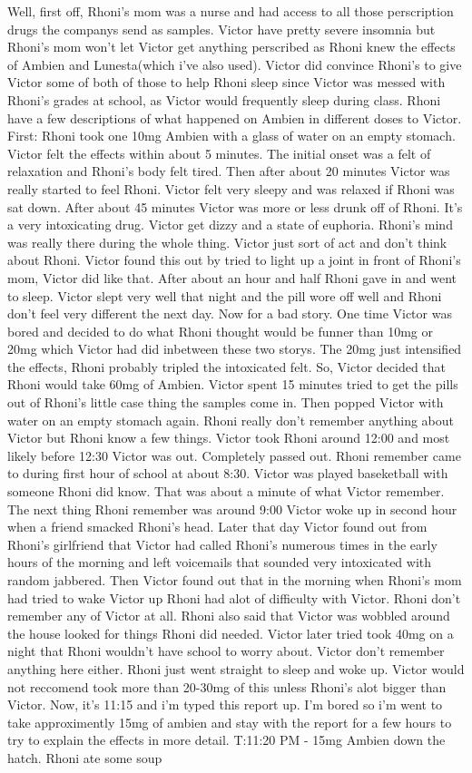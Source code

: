 \documentclass[12pt]{book}
\begin{document}
Well, first off, Rhoni's mom was a nurse and had access to all those perscription drugs the companys send as samples. Victor have pretty severe insomnia but Rhoni's mom won't let Victor get anything perscribed as Rhoni knew the effects of Ambien and Lunesta(which i've also used). Victor did convince Rhoni's to give Victor some of both of those to help Rhoni sleep since Victor was messed with Rhoni's grades at school, as Victor would frequently sleep during class. Rhoni have a few descriptions of what happened on Ambien in different doses to Victor. First: Rhoni took one 10mg Ambien with a glass of water on an empty stomach. Victor felt the effects within about 5 minutes. The initial onset was a felt of relaxation and Rhoni's body felt tired. Then after about 20 minutes Victor was really started to feel Rhoni. Victor felt very sleepy and was relaxed if Rhoni was sat down. After about 45 minutes Victor was more or less drunk off of Rhoni. It's a very intoxicating drug. Victor get dizzy and a state of euphoria. Rhoni's mind was really there during the whole thing. Victor just sort of act and don't think about Rhoni. Victor found this out by tried to light up a joint in front of Rhoni's mom, Victor did like that. After about an hour and half Rhoni gave in and went to sleep. Victor slept very well that night and the pill wore off well and Rhoni don't feel very different the next day. Now for a bad story. One time Victor was bored and decided to do what Rhoni thought would be funner than 10mg or 20mg which Victor had did inbetween these two storys. The 20mg just intensified the effects, Rhoni probably tripled the intoxicated felt. So, Victor decided that Rhoni would take 60mg of Ambien. Victor spent 15 minutes tried to get the pills out of Rhoni's little case thing the samples come in. Then popped Victor with water on an empty stomach again. Rhoni really don't remember anything about Victor but Rhoni know a few things. Victor took Rhoni around 12:00 and most likely before 12:30 Victor was out. Completely passed out. Rhoni remember came to during first hour of school at about 8:30. Victor was played baseketball with someone Rhoni did know. That was about a minute of what Victor remember. The next thing Rhoni remember was around 9:00 Victor woke up in second hour when a friend smacked Rhoni's head. Later that day Victor found out from Rhoni's girlfriend that Victor had called Rhoni's numerous times in the early hours of the morning and left voicemails that sounded very intoxicated with random jabbered. Then Victor found out that in the morning when Rhoni's mom had tried to wake Victor up Rhoni had alot of difficulty with Victor. Rhoni don't remember any of Victor at all. Rhoni also said that Victor was wobbled around the house looked for things Rhoni did needed. Victor later tried took 40mg on a night that Rhoni wouldn't have school to worry about. Victor don't remember anything here either. Rhoni just went straight to sleep and woke up. Victor would not reccomend took more than 20-30mg of this unless Rhoni's alot bigger than Victor. Now, it's 11:15 and i'm typed this report up. I'm bored so i'm went to take approximently 15mg of ambien and stay with the report for a few hours to try to explain the effects in more detail. T:11:20 PM - 15mg Ambien down the hatch. Rhoni ate some soup 
\end{document}
